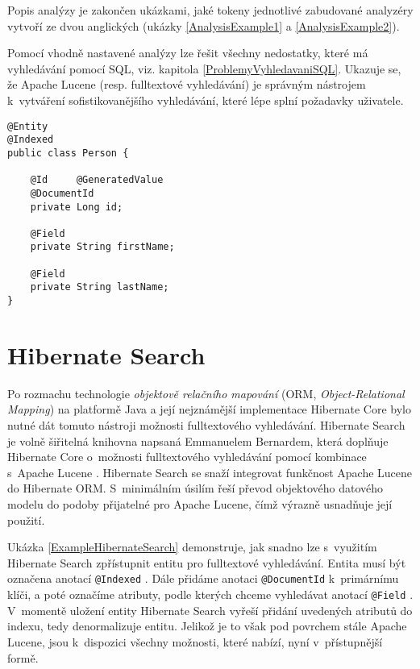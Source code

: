 \documentclass[11pt,oneside]{fithesis2}
\begin{document}
Popis analýzy je zakončen ukázkami, jaké tokeny jednotlivé zabudované analyzéry vytvoří ze dvou anglických (ukázky \ref{AnalysisExample1} a \ref{AnalysisExample2}).

Pomocí vhodně nastavené analýzy lze řešit všechny nedostatky, které má vyhledávání pomocí SQL, viz. kapitola \ref{ProblemyVyhledavaniSQL}. Ukazuje se, že Apache Lucene (resp. fulltextové vyhledávání) je správným nástrojem k~vytváření sofistikovanějšího vyhledávání, které lépe splní požadavky uživatele.

\newpage

\begin{lstlisting}[caption =  Zpřístupnění entity pro vyhledávání v~Hibernate Search, label = ExampleHibernateSearch]
@Entity
@Indexed
public class Person {

	@Id 	@GeneratedValue
	@DocumentId
	private Long id;

	@Field
	private String firstName;

	@Field 
	private String lastName;
}
\end{lstlisting}


\section{Hibernate Search}
Po rozmachu technologie \emph{objektově relačního mapování} (ORM, \emph{Object-Relational Mapping}) na platformě Java a její nejznámější implementace Hibernate Core \cite[s.~29]{HibernateSearchAction} bylo nutné dát tomuto nástroji možnosti fulltextového vyhledávání. Hibernate Search je volně šiřitelná knihovna napsaná Emmanuelem Bernardem, která doplňuje Hibernate Core o~možnosti fulltextového vyhledávání pomocí kombinace s~Apache Lucene  \cite[s.~29]{HibernateSearchAction}. Hibernate Search se snaží integrovat funkčnost Apache Lucene do Hibernate ORM. S~minimálním úsilím řeší převod objektového datového modelu do podoby přijatelné pro Apache Lucene, čímž výrazně usnadňuje její použití.

Ukázka \ref{ExampleHibernateSearch} demonstruje, jak snadno lze s~využitím Hibernate Search zpřístupnit entitu pro fulltextové vyhledávání. Entita musí být označena anotací \texttt{@Indexed}  \cite[s.~38]{HibernateSearchAction}. Dále přidáme anotaci \texttt{@DocumentId} k~primárnímu klíči, a poté označíme atributy, podle kterých chceme vyhledávat anotací \texttt{@Field}  \cite[s.~38]{HibernateSearchAction}. V~momentě uložení entity Hibernate Search vyřeší přidání uvedených atributů do indexu, tedy denormalizuje entitu. Jelikož je to však pod povrchem stále Apache Lucene, jsou k~dispozici všechny možnosti, které nabízí, nyní v~přístupnější formě.
\end{document}
